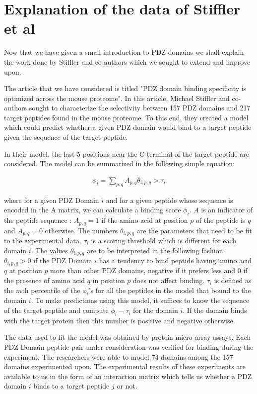 \documentclass[a4paper, 12pt]{article}
\begin{document}
	\section{Explanation of the data of Stiffler et al}

	Now that we have given a small introduction to PDZ domains we shall explain the work done by Stiffler and co-authors which we sought to extend and improve upon.

	The article that we have considered is titled "PDZ domain binding specificity is optimized across the mouse proteome". In this article, Michael Stiffler and co-authors sought to characterize the selectivity between 157 PDZ domains and 217 target peptides found in the mouse proteome. To this end, they created a model which could predict whether a given PDZ domain would bind to a target peptide given the sequence of the target peptide.

	In their model, the last 5 positions near the C-terminal of the target peptide are considered. The model can be summarized in the following simple equation: 

	\begin{align}
	\label{model_base}
	\phi_{i} = \sum_{p,q} A_{p,q} \theta_{i,p,q} > \tau_{i}
	\end{align}

	where for a given PDZ Domain $i$ and for a given peptide whose sequence is encoded in the A matrix, we can calculate a binding score $\phi_{i}$. $A$ is an indicator of the peptide sequence : $A_{p,q} =1$ if the amino acid at position $p$ of the peptide is $q$ and $A_{p,q} =0$ otherwise. The numbers $\theta_{i,p,q}$ are the parameters that need to be fit to the experimental data. $\tau_{i}$ is a scoring threshold which is different for each domain $i$. The values $\theta_{i,p,q}$ are to be interpreted in the following fashion: $\theta_{i,p,q} > 0$ if the PDZ Domain $i$ has a tendency to bind peptide having amino acid $q$ at position $p$ more than other PDZ domains, negative if it prefers less and 0 if the presence of amino acid $q$ in position $p$ does not affect binding. $\tau_{i}$ is defined as the $m$th percentile of the $\phi_{i}$'s for all the peptides in the model that bound to the domain $i$. To make predictions using this model, it suffices to know the sequence of the target peptide and compute $\phi_{i} - \tau_{i}$ for the domain $i$. If the domain binds with the target protein then this number is positive and negative otherwise. 

	The data used to fit the model was obtained by protein micro-array assays. Each PDZ Domain-peptide pair under consideration was verified for binding during the experiment. The researchers were able to model 74 domains among the 157 domains experimented upon. The experimental results of these experiments are available to us in the form of an interaction matrix which tells us whether a PDZ domain $i$ binds to a target peptide $j$ or not. 
\end{document}
